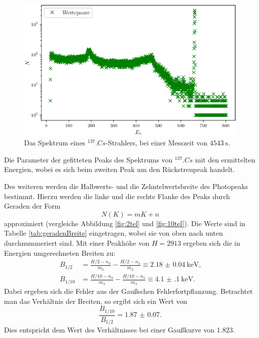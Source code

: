 \begin{figure}
	\centering
	\includegraphics[width=\linewidth-70pt,height=\textheight-70pt,keepaspectratio]{content/images/Cs137.png}
	\caption{Das Spektrum eines $^{137}.{Cs}$-Strahlers, bei einer Messzeit von $\SI{4543}{\second}$.}
	\label{fig:SpektrumCs}
\end{figure}

\begin{table}
	\centering
	\caption{Die Parameter der gefitteten Peaks des Spektrums von $^{137}.{Cs}$ mit den ermittelten Energien, wobei es sich beim zweiten Peak um den Rückstreupeak handelt.}
	
	\label{tab:parameterCs}
\end{table}

\noindent Des weiteren werden die Halbwerts- und die Zehntelwertsbreite des Photopeaks bestimmt. Hierzu werden die linke und die rechte Flanke des Peaks durch Geraden der Form 
\begin{equation}
N(K) = mK+n	\label{eq:Gerade}
\end{equation}
approximiert (vergleiche Abbildung \ref{fig:2tel} und \ref{fig:10tel}). Die Werte sind in Tabelle \ref{tab:geradenBreite} eingetragen, wobei sie von oben nach unten durchnummeriert sind. Mit einer Peakhöhe von $H=2913$ ergeben sich die in Energien umgerechneten Breiten zu:
\begin{align*}
B_{1/2} &= \frac{H/2-n_3}{m_3}-\frac{H/2-n_2}{m_2} \equiv \SI{2.18(4)}{\kilo\electronvolt}\text{,}\\
B_{1/10} &= \frac{H/10-n_4}{m_4}-\frac{H/10-n_4}{m_4} \equiv \SI{4.1(1)}{\kilo\electronvolt}\text{.}
\end{align*}
Dabei ergeben sich die Fehler aus der Gaußschen Fehlerfortpflanzung.
Betrachtet man das Verhältnis der Breiten, so ergibt sich ein Wert von 
\[
\frac{B_{1/10}}{B_{1/2}} = \num{1.87(7)}\text{.}
\]
Dies entspricht dem Wert des Verhältnisses bei einer Gaußkurve von $\num{1.823}$.

